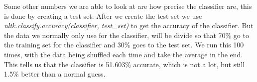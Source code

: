 Some other numbers we are able to look at are how precise the classifier are, this is done by creating a test set.
After we create the test set we use \textit{nltk.classify.accuracy(classifier, test\_set)} to get the accuracy of the classifier. But the data we normally only use for the classifier, will be divide so that 70\% go to the training set for the classifier and 30\% goes to the test set. We run this 100 times, with the data being shuffled each time and take the average in the end. This tells us that the classifier is 51.603\% accurate, which is not a lot, but still 1.5\% better than a normal guess.